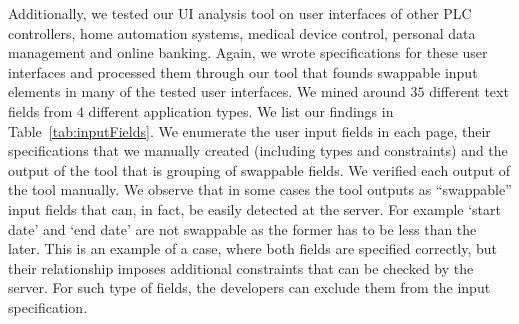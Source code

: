 Additionally, we tested our UI analysis tool on user interfaces of other PLC controllers, home automation systems, medical device control, personal data management and online banking. Again, we wrote specifications for these user interfaces and processed them through our tool that founds swappable input elements in many of the tested user interfaces. We mined around $35$ different text fields from $4$ different application types. We list our findings in Table~\ref{tab:inputFields}. We enumerate the user input fields in each page, their specifications that we manually created (including types and constraints) and the output of the tool that is grouping of swappable fields. We verified each output of the tool manually. We observe that in some cases the tool outputs as ``swappable'' input fields that can, in fact, be easily detected at the server. For example `start date' and `end date' are not swappable as the former has to be less than the later. This is an example of a case, where both fields are specified correctly, but their relationship imposes additional constraints that can be checked by the server. For such type of fields, the developers can exclude them from the input specification.

